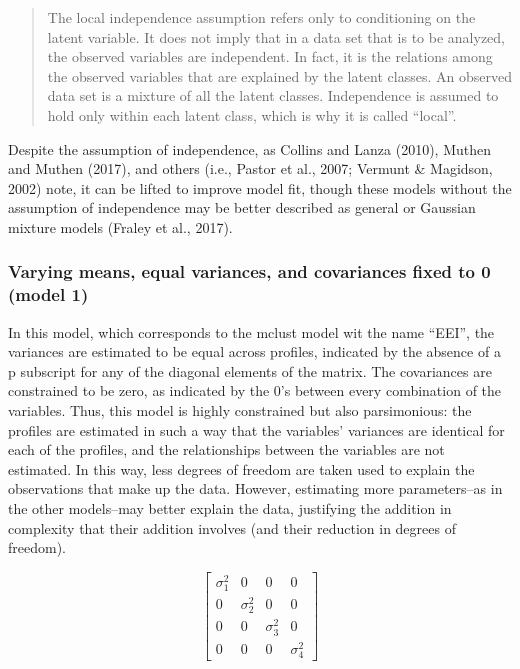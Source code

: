 \documentclass[]{msu-thesis}
\theoremstyle{definition}
\theoremstyle{definition}
\theoremstyle{definition}
\theoremstyle{remark}
\begin{document}
\begin{quote}
The local independence assumption refers only to conditioning on the
latent variable. It does not imply that in a data set that is to be
analyzed, the observed variables are independent. In fact, it is the
relations among the observed variables that are explained by the latent
classes. An observed data set is a mixture of all the latent classes.
Independence is assumed to hold only within each latent class, which is
why it is called ``local''.
\end{quote}

Despite the assumption of independence, as Collins and Lanza (2010),
Muthen and Muthen (2017), and others (i.e., Pastor et al., 2007; Vermunt
\& Magidson, 2002) note, it can be lifted to improve model fit, though
these models without the assumption of independence may be better
described as general or Gaussian mixture models (Fraley et al., 2017).

\subsubsection{Varying means, equal variances, and covariances fixed to
0 (model
1)}\label{varying-means-equal-variances-and-covariances-fixed-to-0-model-1}

In this model, which corresponds to the mclust model wit the name
``EEI'', the variances are estimated to be equal across profiles,
indicated by the absence of a p subscript for any of the diagonal
elements of the matrix. The covariances are constrained to be zero, as
indicated by the 0's between every combination of the variables. Thus,
this model is highly constrained but also parsimonious: the profiles are
estimated in such a way that the variables' variances are identical for
each of the profiles, and the relationships between the variables are
not estimated. In this way, less degrees of freedom are taken used to
explain the observations that make up the data. However, estimating more
parameters--as in the other models--may better explain the data,
justifying the addition in complexity that their addition involves (and
their reduction in degrees of freedom).

\[
\left[ \begin{matrix} { \sigma  }_{ 1 }^{ 2 } & 0 & 0 & 0 \\ 0 & { \sigma  }_{ 2 }^{ 2 } & 0 & 0 \\ 0 & 0 & { \sigma  }_{ 3 }^{ 2 } & 0 \\ 0 & 0 & 0 & { \sigma  }_{ 4 }^{ 2 } \end{matrix} \right] 
\]
\end{document}
